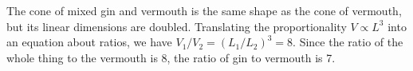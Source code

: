 The cone of mixed gin and vermouth is the same shape as
the cone of vermouth, but its linear dimensions are doubled.
Translating the proportionality $V\propto L^3$ into an equation
about ratios, we have $V_1/V_2=(L_1/L_2)^3=8$.
Since the ratio of the whole thing to the vermouth is 8,
the ratio of gin to vermouth is 7.
